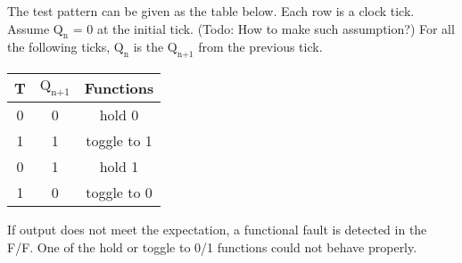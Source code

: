 The test pattern can be given as the table below. Each row is a clock tick. Assume $\text{Q}_\text{n}$ = 0 at the initial tick. {\color{red} (Todo: How to make such assumption?)} For all the following ticks, $\text{Q}_\text{n}$ is the $\text{Q}_\text{n+1}$ from the previous tick.
\begin{center}
  \begin{tabular}{c | c | c}
    T & $\text{Q}_\text{n+1}$ & Functions \\
    \hline
    0 & 0 & hold 0 \\
    1 & 1 & toggle to 1 \\
    0 & 1 & hold 1 \\
    1 & 0 & toggle to 0 \\
  \end{tabular}
\end{center}
If output does not meet the expectation, a functional fault is detected in the F/F. One of the hold or toggle to 0/1 functions could not behave properly.
